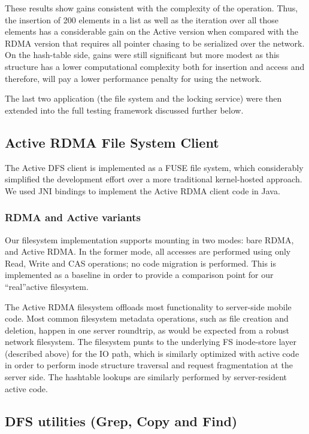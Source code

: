 \documentclass[10pt]{article}
\begin{document}
These results show gains consistent with the complexity of the
operation. Thus, the insertion of 200 elements in a list as well as
the iteration over all those elements has a considerable gain on the
Active version when compared with the RDMA version that requires all
pointer chasing to be serialized over the network. On the hash-table
side, gains were still significant but more modest as this structure
has a lower computational complexity both for insertion and access and
therefore, will pay a lower performance penalty for using the network.

The last two application (the file system and the locking service)
were then extended into the full testing framework discussed further
below.

\subsection{Active RDMA File System Client}

The Active DFS client is implemented as a FUSE file system, which
considerably simplified the development effort over a more traditional
kernel-hosted approach. We used JNI bindings to implement the Active
RDMA client code in Java.

\subsubsection{RDMA and Active variants}

Our filesystem implementation supports mounting in two modes: bare
RDMA, and Active RDMA. In the former mode, all accesses are performed
using only Read, Write and CAS operations; no code migration is
performed. This is implemented as a baseline in order to provide a
comparison point for our ``real''active filesystem.

The Active RDMA filesystem offloads most functionality to server-side
mobile code. Most common filesystem metadata operations, such as file
creation and deletion, happen in one server roundtrip, as would be
expected from a robust network filesystem. The filesystem punts to the
underlying FS inode-store layer (described above) for the IO path,
which is similarly optimized with active code in order to perform
inode structure traversal and request fragmentation at the server
side. The hashtable lookups are similarly performed by server-resident
active code.

\subsection{DFS utilities (Grep, Copy and Find)}
\end{document}
